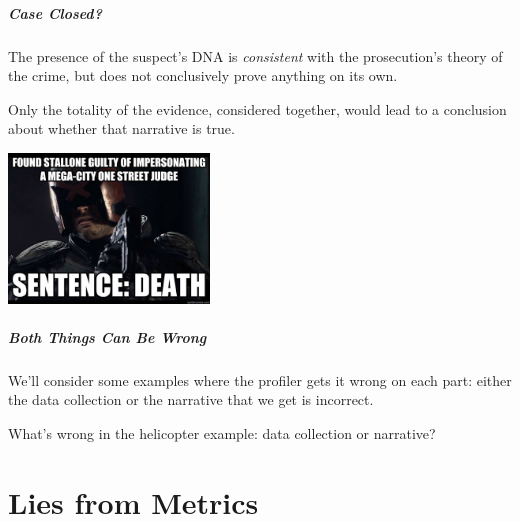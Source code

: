 \begin{frame}
\frametitle{Case Closed?}

The presence of the suspect's DNA is \textit{consistent} with the prosecution's theory of the crime, but does not conclusively prove anything on its own.


Only the totality of the evidence, considered together, would lead to a conclusion about whether that narrative is true.

\begin{center}
	\includegraphics[width=0.4\textwidth]{images/dredd2.jpg}
\end{center}

\end{frame}

\begin{frame}
\frametitle{Both Things Can Be Wrong}

We'll consider some examples where the profiler gets it wrong on each part: either the data collection or the narrative that we get is incorrect.

What's wrong in the helicopter example: data collection or narrative?



\end{frame}



\part{Lies from Metrics}

\begin{frame}
  \partpage
\end{frame}

